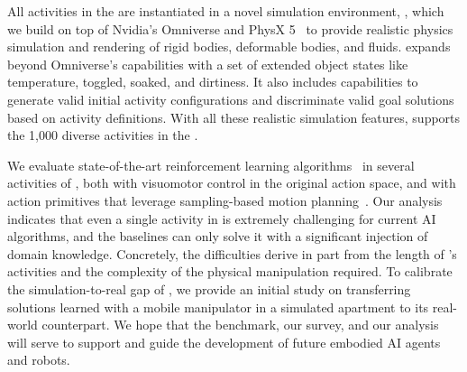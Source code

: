 All activities in the \dataset are instantiated in a novel simulation environment, \simulator, which we build on top of Nvidia's Omniverse and PhysX 5~\cite{physx} to provide realistic physics simulation and rendering of rigid bodies, deformable bodies, and fluids. 
\simulator expands beyond Omniverse's capabilities with a set of extended object states like temperature, toggled, soaked, and dirtiness. It also includes capabilities to generate valid initial activity configurations and discriminate valid goal solutions based on activity definitions. %
With all these realistic simulation features, \simulator supports the 1,000 diverse activities in the \dataset.


We evaluate state-of-the-art reinforcement learning algorithms~\cite{schulman2017proximal,haarnoja2018soft} in several activities of \benchmark, both with visuomotor control in the original action space, and with action primitives that leverage sampling-based motion planning~\cite{Jordan.Perez.ea:CSAIL13}. Our analysis indicates that even a single activity in \benchmark is extremely challenging for current AI algorithms, and the baselines can only solve it with a significant injection of domain knowledge. Concretely, the difficulties derive in part from the length of \benchmark's activities and the complexity of the physical manipulation required. To calibrate the simulation-to-real gap of \benchmark, we provide an initial study on transferring solutions learned with a mobile manipulator in a simulated apartment to its real-world counterpart. %
We hope that the \benchmark benchmark, our survey, and our analysis will serve to support and guide the development of future embodied AI agents and robots.      

\vspace{1cm}

